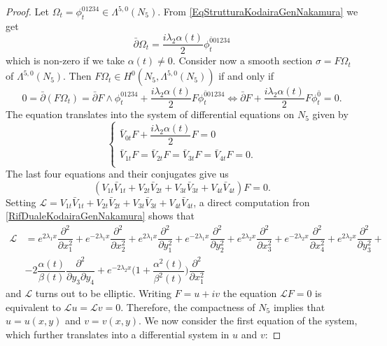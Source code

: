 \documentclass[a4paper, 11pt]{amsart}
\theoremstyle{plain}
\theoremstyle{definition}
\newcommand{\del}{\partial}
\newcommand{\delbar}{\bar{\partial}}
\numberwithin{equation}{section}
\begin{document}
\begin{proof}
	Let $ \Omega_{t} = \phi_{t}^{01234} \in \Lambda^{5,0}(N_{5})$. From \eqref{EqStrutturaKodairaGenNakamura} we get
	\[ \delbar\Omega_{t} = \dfrac{i\lambda_{2}\alpha(t)}{2} \phi_{t}^{\bar 0 01234}\]
	which is non-zero if we take $ \alpha(t) \ne 0 $. Consider now a smooth section $ \sigma = F\Omega_{t} $ of $\Lambda^{5,0}(N_{5})  $. Then $ F\Omega_{t} \in H^{0}(N_{5}, \Lambda^{5,0}(N_{5})) $ if and only if
	\[ 0 = \delbar(F\Omega_{t}) = \delbar F \wedge  \phi_{t}^{01234}  +   \dfrac{i\lambda_{2}\alpha(t)}{2} F\phi_{t}^{\bar 0 01234} \iff \delbar F +   \dfrac{i\lambda_{2}\alpha(t)}{2} F\phi_{t}^{\bar 0} = 0.\]
	The equation translates into the system of differential equations on $ N_{5} $ given by
	\[ \begin{cases}
		\bar V_{0t}F +   \dfrac{i\lambda_{2}\alpha(t)}{2} F = 0 \\
		\bar V_{1t}F = \bar V_{2t}F = \bar V_{3t}F = \bar V_{4t}F = 0. \\
	\end{cases} \]
	The last four equations and their conjugates give us
	\[ (V_{1t}\bar V_{1t} + V_{2t}\bar V_{2t} + V_{3t}\bar V_{3t} + V_{4t}\bar V_{4t})F = 0. \]
	Setting $ \mathcal{L} =  V_{1t}\bar V_{1t} + V_{2t}\bar V_{2t} + V_{3t}\bar V_{3t} + V_{4t}\bar V_{4t}$, a direct computation fron \eqref{RifDualeKodairaGenNakamura} shows that
	\begin{equation*}
			\begin{split}
			\mathcal{L} & = e^{2\lambda_{1}x}\dfrac{\del^{2}}{\del x_{1}^{2}} + e^{-2\lambda_{1}x}\dfrac{\del^{2}}{\del x_{2}^{2}} + e^{2\lambda_{1}x}\dfrac{\del^{2}}{\del y_{1}^{2}} + e^{-2\lambda_{1}x}\dfrac{\del^{2}}{\del y_{2}^{2}} + e^{2\lambda_{2}x}\dfrac{\del^{2}}{\del x_{3}^{2}} + e^{-2\lambda_{2}x}\dfrac{\del^{2}}{\del x_{4}^{2}} + e^{2\lambda_{2}x}\dfrac{\del^{2}}{\del y_{3}^{2}} + \\
			& -2\dfrac{\alpha(t)}{\beta(t)}\dfrac{\del^{2}}{\del y_{3}\del y_{4}} + e^{-2\lambda_{2}x}\bigg(1 + \dfrac{\alpha^{2}(t)}{\beta^{2}(t)}\bigg)\dfrac{\del^{2}}{\del x_{1}^{2}}
		\end{split}
	\end{equation*}
	and $\mathcal{L}$ turns out to be elliptic. Writing $ F = u + iv $ the equation $ \mathcal{L}F = 0 $ is equivalent to $ \mathcal{L}u = \mathcal{L}v = 0 $. Therefore, the compactness of $ N_{5} $ implies that $ u = u(x,y)$ and $ v = v(x,y) $. We now consider the first equation of the system, which further translates into a differential system in $ u $ and $ v $:

\end{proof}
\end{document}
